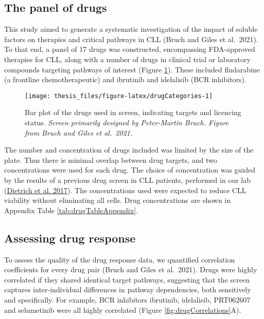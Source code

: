\documentclass[11pt, a4paper, twosided]{book}
\begin{document}
\hypertarget{the-panel-of-drugs}{%
\subsection{The panel of drugs}\label{the-panel-of-drugs}}

This study aimed to generate a systematic investigation of the impact of soluble factors on therapies and critical pathways in CLL (Bruch and Giles et al.~2021). To that end, a panel of 17 drugs was constructed, encompassing FDA-approved therapies for CLL, along with a number of drugs in clinical trial or laboratory compounds targeting pathways of interest (Figure \ref{fig:drugCategories}). These included fludarabine (a frontline chemotherapeutic) and ibrutinib and idelalisib (BCR inhibitors).


\begin{figure}

{\centering \texttt{[image: thesis\_files/figure-latex/drugCategories-1]} 

}

\caption{Bar plot of the drugs used in screen, indicating targets and licencing status. \emph{Screen primarily designed by Peter-Martin Bruch. Figure from Bruch and Giles et al.~2021.}}\label{fig:drugCategories}
\end{figure}
The number and concentration of drugs included was limited by the size of the plate. Thus there is minimal overlap between drug targets, and two concentrations were used for each drug. The choice of concentration was guided by the results of a previous drug screen in CLL patients, performed in our lab (\protect\hyperlink{ref-JCIpaper}{Dietrich et al. 2017}). The concentrations used were expected to reduce CLL viability without eliminating all cells. Drug concentrations are shown in Appendix Table \ref{tab:drugTableAppendix}.

\hypertarget{drug-responses}{%
\subsection{Assessing drug response}\label{drug-responses}}

To assess the quality of the drug response data, we quantified correlation coefficients for every drug pair (Bruch and Giles et al.~2021). Drugs were highly correlated if they shared identical target pathways, suggesting that the screen captures inter-individual differences in pathway dependencies, both sensitively and specifically. For example, BCR inhibitors ibrutinib, idelalisib, PRT062607 and selumetinib were all highly correlated (Figure \ref{fig:drugCorrelations}A).
\end{document}
